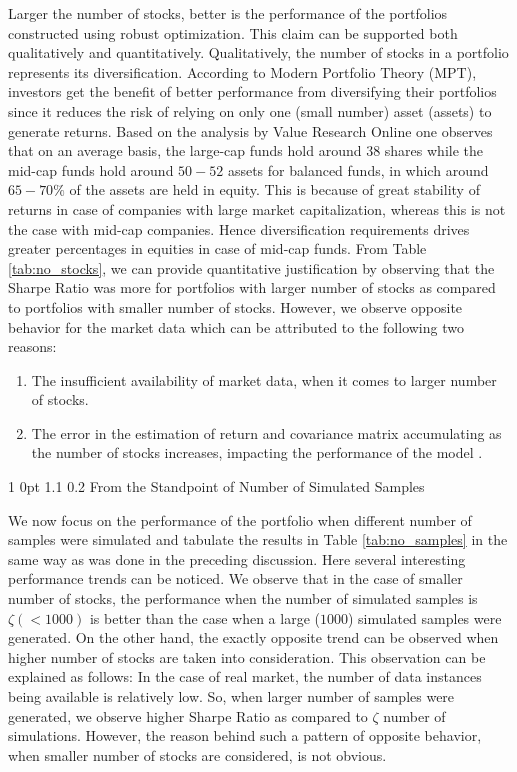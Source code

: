 \documentclass[12pt]{article}
\makeatletter
\numberwithin{equation}{section}
\renewcommand{\subsection}{
  \@startsection
  {subsection}%
  {1}%
  {0pt}%
  {1.1\baselineskip}%
  {0.2\baselineskip}%
  {\sc \centering}%
}
\makeatother
\begin{document}
Larger the number of stocks, better is the performance of the portfolios constructed using robust optimization. This claim can be supported both qualitatively and quantitatively. Qualitatively, the number of stocks in a portfolio represents its diversification. According to Modern Portfolio Theory (MPT), investors get the benefit of better performance from diversifying their portfolios since it reduces the risk of relying on only one (small number) asset (assets) to generate returns. Based on the analysis by Value Research Online \cite{vro} one observes that on an average basis, the large-cap funds hold around $38$ shares while the mid-cap funds hold around $50-52$ assets for balanced funds, in which around $65-70\%$ of the assets are held in equity. This is because of great stability of returns in case of companies with large market capitalization, whereas this is not the case with mid-cap companies. Hence diversification requirements drives greater percentages in equities in case of mid-cap funds. From Table \ref{tab:no_stocks}, we can provide quantitative justification by observing that the Sharpe Ratio was more for portfolios with larger number of stocks as compared to portfolios with smaller number of stocks. However, we observe opposite behavior for the market data which can be attributed to the following two reasons:
\begin{enumerate}
\item The insufficient availability of market data, when it comes to larger number of stocks.
\item The error in the estimation of return and covariance matrix accumulating as the number of stocks increases, impacting the performance of the model \cite{Michaud89}.
\end{enumerate}

\subsection{From the Standpoint of Number of Simulated Samples}

We now focus on the performance of the portfolio when different number of samples were simulated and tabulate the results in Table \ref{tab:no_samples} in the same way as was done in the preceding discussion. Here several interesting performance trends can be noticed. We observe that in the case of smaller number of stocks, the performance when the number of simulated samples is $\zeta (< 1000)$ is better than the case when a large ($1000$) simulated samples were generated. On the other hand, the exactly opposite trend can be observed when higher number of stocks are taken into consideration. This observation can be explained as follows: In the case of real market, the number of data instances being available is relatively low. So, when larger number of samples were generated, we observe higher Sharpe Ratio as compared to $\zeta$ number of simulations. However, the reason behind such a pattern of opposite behavior, when smaller number of stocks are considered, is not obvious.
\end{document}
